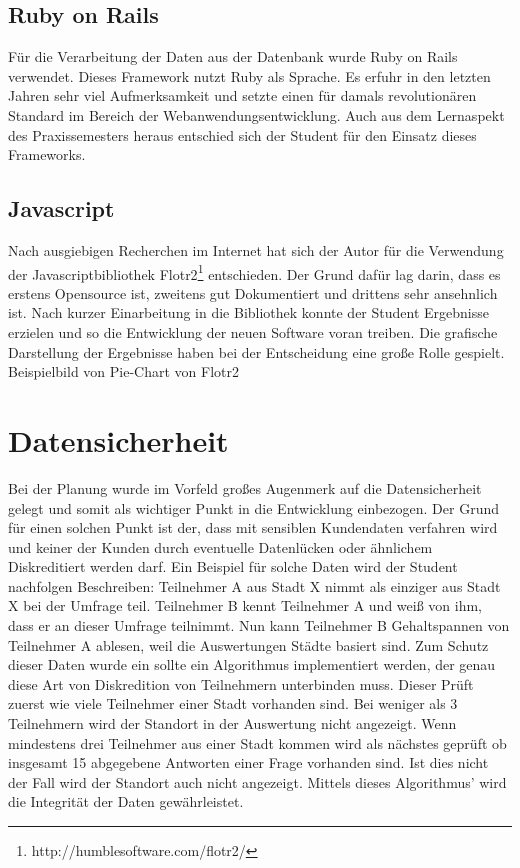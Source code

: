 \subsection{Ruby on Rails}
Für die Verarbeitung der Daten aus der Datenbank wurde Ruby on Rails verwendet. 
Dieses Framework nutzt Ruby als Sprache. Es erfuhr in den letzten Jahren sehr viel Aufmerksamkeit und setzte einen für damals revolutionären Standard im Bereich der Webanwendungsentwicklung. 
Auch aus dem Lernaspekt des Praxissemesters heraus entschied sich der Student für den Einsatz dieses Frameworks.
\subsection{Javascript}
Nach ausgiebigen Recherchen im Internet hat sich der Autor für die Verwendung der Javascriptbibliothek Flotr2\footnote{http://humblesoftware.com/flotr2/} entschieden. Der Grund dafür lag darin, dass es erstens Opensource ist, zweitens gut Dokumentiert und drittens sehr ansehnlich ist. 
Nach kurzer Einarbeitung in die Bibliothek konnte der Student Ergebnisse erzielen und so die Entwicklung der neuen Software voran treiben. Die grafische Darstellung der Ergebnisse haben bei der Entscheidung eine große Rolle gespielt.
{Beispielbild von Pie-Chart von Flotr2}
\section{Datensicherheit}
Bei der Planung wurde im Vorfeld großes Augenmerk auf die Datensicherheit gelegt und somit als wichtiger Punkt in die Entwicklung einbezogen. Der Grund für einen solchen Punkt ist der, dass mit sensiblen Kundendaten verfahren wird und keiner der Kunden durch eventuelle Datenlücken oder ähnlichem Diskreditiert werden darf.
Ein Beispiel für solche Daten wird der Student nachfolgen Beschreiben: 
Teilnehmer A aus Stadt X nimmt als einziger aus Stadt X bei der Umfrage teil. Teilnehmer B kennt Teilnehmer A und wei\ss{} von ihm, dass er an dieser Umfrage teilnimmt. Nun kann Teilnehmer B Gehaltspannen von Teilnehmer A ablesen, weil die Auswertungen St\"adte basiert sind. Zum Schutz dieser Daten wurde ein sollte ein Algorithmus implementiert werden, der genau diese Art von Diskredition von Teilnehmern unterbinden muss. Dieser Pr\"uft zuerst wie viele Teilnehmer einer Stadt vorhanden sind. Bei weniger als 3 Teilnehmern wird der Standort in der Auswertung nicht angezeigt. Wenn mindestens drei Teilnehmer aus einer Stadt kommen wird als n\"achstes gepr\"uft ob insgesamt 15 abgegebene Antworten einer Frage vorhanden sind. Ist dies nicht der Fall wird der Standort auch nicht angezeigt. Mittels dieses Algorithmus' wird die Integrität der Daten gew\"ahrleistet.